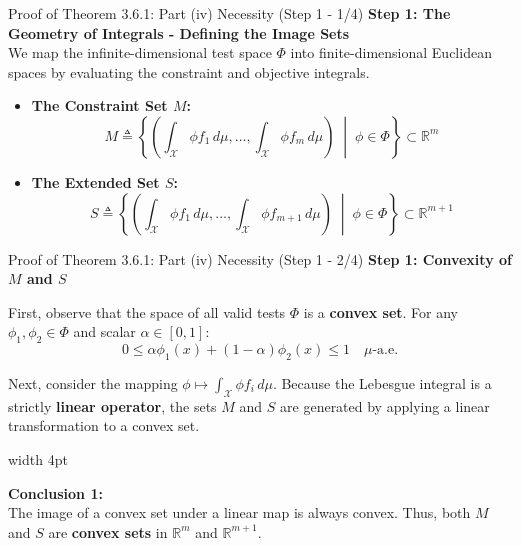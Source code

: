 \documentclass[10pt, aspectratio=169, xcolor=dvipsnames]{beamer}
\newcommand{\lead}[1]{{\color{UniBlue}\bfseries #1}}
\begin{document}
\begin{frame}{Proof of Theorem 3.6.1: Part (iv) Necessity (Step 1 - 1/4)}
    \lead{Step 1: The Geometry of Integrals - Defining the Image Sets}\\
    \vspace{0.2cm}
    We map the infinite-dimensional test space $\Phi$ into finite-dimensional Euclidean spaces by evaluating the constraint and objective integrals.
    
    \vspace{0.4cm}
    \begin{itemize}
        \item[{ \tikz\fill[Teal] (0,0) circle (2pt); }] \textbf{The Constraint Set $M$:}
        \[ M \triangleq \left\{ \left( \int_{\mathcal{X}} \phi f_1 \, d\mu, \dots, \int_{\mathcal{X}} \phi f_m \, d\mu \right) \;\middle|\; \phi \in \Phi \right\} \subset \mathbb{R}^m \]
        
        \vspace{0.4cm}
        \item[{ \tikz\fill[Teal] (0,0) circle (2pt); }] \textbf{The Extended Set $S$:}
        \[ S \triangleq \left\{ \left( \int_{\mathcal{X}} \phi f_1 \, d\mu, \dots, \int_{\mathcal{X}} \phi f_{m+1} \, d\mu \right) \;\middle|\; \phi \in \Phi \right\} \subset \mathbb{R}^{m+1} \]
    \end{itemize}
\end{frame}

\begin{frame}{Proof of Theorem 3.6.1: Part (iv) Necessity (Step 1 - 2/4)}
    \lead{Step 1: Convexity of $M$ and $S$}\\
    \vspace{0.4cm}
    
    First, observe that the space of all valid tests $\Phi$ is a \textbf{convex set}. For any $\phi_1, \phi_2 \in \Phi$ and scalar $\alpha \in [0,1]$:
    \[ 0 \le \alpha \phi_1(x) + (1-\alpha)\phi_2(x) \le 1 \quad \mu\text{-a.e.} \]
    
    \vspace{0.4cm}
    Next, consider the mapping $\phi \mapsto \int_{\mathcal{X}} \phi f_i \, d\mu$. Because the Lebesgue integral is a strictly \textbf{linear operator}, the sets $M$ and $S$ are generated by applying a linear transformation to a convex set.
    
    \vspace{0.4cm}
    \noindent
    {\color{Teal}\vrule width 4pt}%
    \hspace{10pt}%
    \begin{minipage}{\dimexpr\textwidth-14pt\relax}
        \color{Slate}
        \textbf{Conclusion 1:}\\
        The image of a convex set under a linear map is always convex. Thus, both $M$ and $S$ are \textbf{convex sets} in $\mathbb{R}^m$ and $\mathbb{R}^{m+1}$.
    \end{minipage}
\end{frame}
\end{document}
